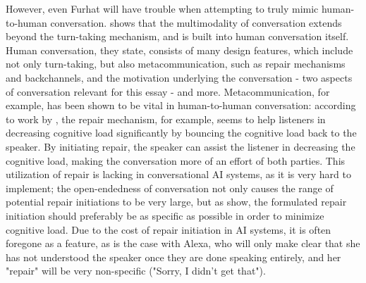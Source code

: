 \documentclass[11pt]{article}
\begin{document}
However, even Furhat will have trouble when attempting to truly mimic human-to-human conversation.
\citet{levinson2019natural} shows that the multimodality of conversation extends beyond the turn-taking mechanism, and is built into human conversation itself.
Human conversation, they state, consists of many design features, which include not only turn-taking, but also metacommunication, such as repair mechanisms and backchannels, and the motivation underlying the conversation - two aspects of conversation relevant for this essay - and more.
Metacommunication, for example, has been shown to be vital in human-to-human conversation: according to work by \citet{dingemanse2024interactive}, the repair mechanism, for example, seems to help listeners in decreasing cognitive load significantly by bouncing the cognitive load back to the speaker.
By initiating repair, the speaker can assist the listener in decreasing the cognitive load, making the conversation more of an effort of both parties.
This utilization of repair is lacking in conversational AI systems, as it is very hard to implement; the open-endedness of conversation not only causes the range of potential repair initiations to be very large, but as \citeauthor{dingemanse2024interactive} show, the formulated repair initiation should preferably be as specific as possible in order to minimize cognitive load.
Due to the cost of repair initiation in AI systems, it is often foregone as a feature, as is the case with Alexa, who will only make clear that she has not understood the speaker once they are done speaking entirely, and her "repair" will be very non-specific ("Sorry, I didn't get that").
\end{document}

